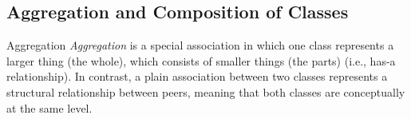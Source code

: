 \subsection{Aggregation and Composition of Classes}
\begin{frame}{\insertsubsection}
	\begin{fancycolumns}[animation=none]
		\begin{definition}{{Aggregation }}
			\emph{Aggregation} is a special association in which one class represents a larger thing (the whole), which consists of smaller things (the parts) (i.e., has-a relationship). In contrast, a plain association between two classes represents a structural relationship between peers, meaning that both classes are conceptually at the same level.
		\end{definition}
		\nextcolumn
	\end{fancycolumns}
\end{frame}


